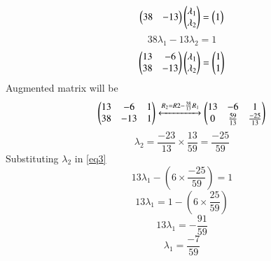 \documentclass[journal,12pt,twocolumn]{IEEEtran}
\begin{document}
\begin{equation}
    \begin{pmatrix}38 & -13\end{pmatrix}\begin{pmatrix}\lambda{_1}\\\lambda{_2}\end{pmatrix} = \begin{pmatrix}1\end{pmatrix}
\end{equation}
\begin{equation}
    38\lambda{_1} - 13\lambda{_2} = 1
\end{equation}
\begin{equation}
    \begin{pmatrix}13 & -6\\38 & -13\end{pmatrix}\begin{pmatrix}\lambda{_1}\\\lambda{_2}\end{pmatrix} = \begin{pmatrix}1\\1\end{pmatrix} 
\end{equation}
Augmented matrix will be
\begin{equation}
    \begin{pmatrix}13 & -6 & 1\\38 & -13 & 1\end{pmatrix}\xleftrightarrow[]{R_2 = R2 - \frac{38}{13}R_1}\begin{pmatrix}13 & -6 & 1\\0 & \frac{59}{13} & \frac{-25}{13}\end{pmatrix}
\end{equation}
\begin{equation}
    \lambda{_2} = \frac{-23}{13} \times \frac{13}{59}  = \frac{-25}{59}
\end{equation}
Substituting $\lambda{_2}$ in \eqref{eq3}
\begin{equation}
    13\lambda{_1} - \left(6 \times \frac{-25}{59}\right) = 1
\end{equation}
\begin{equation}
    13\lambda{_1} = 1 - \left(6 \times \frac{25}{59}\right)
\end{equation}
\begin{equation}
    13\lambda{_1} = -\frac{91}{59}
\end{equation}
\begin{equation}
    \lambda{_1} = \frac{-7}{59}
\end{equation}
\end{document}
